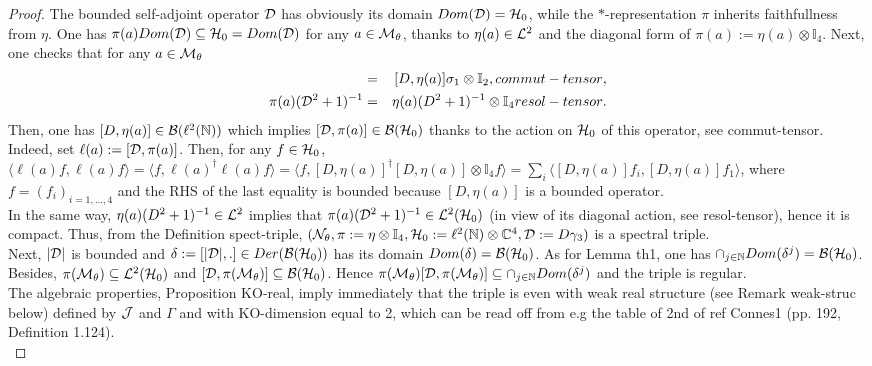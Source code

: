 \documentclass[10pt]{book}
\theoremstyle{break}
\begin{document}
\begin{proof}
The bounded self-adjoint operator ${\cal{D}}$ has obviously its domain $Dom({\cal{D}})={\cal{H}}_0$, while the $*$-representation $\pi$ inherits faithfullness from $\eta$. One has $\pi(a)Dom({\cal{D}})\subseteq {\cal{H}}_0=Dom({\cal{D}})$ for any $a\in{\cal{M}}_\theta$, thanks to $\eta(a)\in{\cal{L}}^2$ and the diagonal form of $\pi(a):=\eta(a)\otimes\mathbb{I}_4$. Next, one checks that for any $a\in{\cal{M}}_\theta$
\begin{eqnarray*}
[{\cal{D}},\pi(a)]&=&[D,\eta(a)]\sigma_1\otimes\mathbb{I}_2,{commut-tensor},\\
\pi(a)({\cal{D}}^2+1)^{-1}&=&\eta(a)(D^2+1)^{-1}\otimes\mathbb{I}_4{resol-tensor}.
\end{eqnarray*}
Then, one has $[D,\eta(a)]\in{\cal{B}}(\ell^2(\mathbb{N}))$ which implies $[{\cal{D}},\pi(a)]\in{\cal{B}}({\cal{H}}_0)$ thanks to the action on ${\cal{H}}_0$ of this operator, see {commut-tensor}. Indeed, set $\ell(a):=[{\cal{D}},\pi(a)]$. Then, for any $f\in{\cal{H}}_0$, $\langle \ell(a)f ,\ell(a)f \rangle=\langle f ,\ell(a)^\dag\ell(a)f \rangle=\langle f ,[D,\eta(a)]^\dag[D,\eta(a)]\otimes\mathbb{I}_4f \rangle=\sum_i\langle [D,\eta(a)]f_i , [D,\eta(a)]f_1\rangle$, where $f=(f_i)_{i=1,...,4}$ and the RHS of the last equality is bounded because $[D,\eta(a)]$ is a bounded operator. \\
In the same way, $\eta(a)(D^2+1)^{-1}\in{\cal{L}}^2$ implies that $\pi(a)({\cal{D}}^2+1)^{-1}\in{\cal{L}}^2({\cal{H}}_0)$ (in view of its diagonal action, see {resol-tensor}), hence it is compact. Thus, from the Definition {spect-triple}, $({\cal{N}}_\theta,\pi:=\eta\otimes\mathbb{I}_4,{\cal{H}}_0:=\ell^2(\mathbb{N})\otimes\mathbb{C}^4,{\cal{D}}:=D\gamma_3)$ is a spectral triple.\\
Next, $|{\cal{D}}|$ is bounded and $\delta:=[|{\cal{D}}|,.]\in Der({\cal{B}}({\cal{H}}_0))$ has its domain $Dom(\delta)={\cal{B}}({\cal{H}}_0)$. As for Lemma {th1}, one has $\cap_{j\in\mathbb{N}}Dom(\delta^j) ={\cal{B}}({\cal{H}}_0)$. Besides, $\pi({\cal{M}}_\theta)\subseteq{\cal{L}}^2({\cal{H}}_0)$ and $[{\cal{D}},\pi({\cal{M}}_\theta)]\subseteq{\cal{B}}({\cal{H}}_0)$. Hence $\pi({\cal{M}}_\theta)[{\cal{D}},\pi({\cal{M}}_\theta)]\subseteq\cap_{j\in\mathbb{N}}Dom(\delta^j)$ and the triple is regular.\\
The algebraic properties, Proposition {KO-real}, imply immediately that the triple is even with weak real structure (see Remark {weak-struc} below) defined by ${\cal{J}}$ and $\Gamma$ and with KO-dimension equal to 2, which can be read off from e.g the table of 2nd of ref {Connes1} (pp. 192, Definition 1.124).\\

\end{proof}
\end{document}
